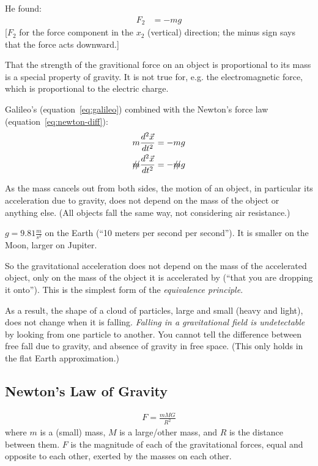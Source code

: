 \documentclass[pagesize,headsepline,10pt,parskip=half,BCOR=12mm]{scrreprt}
\newcommand{\eg}{\mbox{e.g.}\xspace}
\begin{document}
        He found:
        \begin{align}\label{eq:galileo}
          F_2 &= -mg
        \end{align}
        [$F_2$ for the force component in the $x_2$ (vertical)
        direction; the minus sign says that the force acts downward.]

        That the strength of the gravitional force on an object is
        proportional to its mass is a special property of gravity.
        It is not true for, \eg the electromagnetic force, which is
        proportional to the electric charge.

        Galileo's (equation~\ref{eq:galileo}) combined with the
        Newton's force law (equation~\ref{eq:newton-diff}):
        \begin{align}
          m\frac{d^2\vec x}{dt^2} &= -mg \\
          \xout{m}\frac{d^2\vec x}{dt^2} &= -\xout{m}g
        \end{align}

        As the mass cancels out from both sides, the motion of an
        object, in particular its acceleration due to gravity, does
        not depend on the mass of the object or anything else. (All
        objects fall the same way, not considering air resistance.)

        $g = 9.81 \frac{m}{s^2}$ on the Earth (``10 meters per second
        per second''). It is smaller on the Moon, larger on Jupiter.

        So the gravitational acceleration does not depend on the mass
        of the accelerated object, only on the mass of the object it
        is accelerated by (``that you are dropping it onto''). This
        is the simplest form of the \emph{equivalence principle}.

        As a result, the shape of a cloud of particles, large and
        small (heavy and light), does not change when it is falling.
        \emph{Falling in a gravitational field is undetectable} by
        looking from one particle to another.  You cannot tell the
        difference between free fall due to gravity, and absence of
        gravity in free space. (This only holds in the flat Earth
        approximation.)

      \subsection{Newton's Law of Gravity}
        \begin{align}\label{eq:newton-gravity}
          F = \frac{mMG}{R^2}
        \end{align}
        where $m$ is a (small) mass, $M$ is a large/other mass, and
        $R$ is the distance between them.  $F$ is the magnitude of
        each of the gravitational forces, equal and opposite to
        each other, exerted by the masses on each other.
\end{document}
